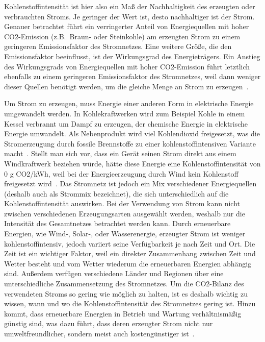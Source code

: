 Kohlenstoffintensität ist hier also ein Maß der Nachhaltigkeit des erzeugten oder verbrauchten Stroms.
Je geringer der Wert ist, desto nachhaltiger ist der Strom.
Genauer betrachtet führt ein verringerter Anteil von Energiequellen mit hoher \ac{CO2}-Emission (z.B.\ Braun- oder Steinkohle) am erzeugten Strom zu einem geringeren Emissionsfaktor des Stromnetzes.
Eine weitere Größe, die den Emissionsfaktor beeinflusst, ist der Wirkungsgrad des Energieträgers.
Ein Anstieg des Wirkungsgrads von Energiequellen mit hoher \ac{CO2}-Emission führt letztlich ebenfalls zu einem geringeren Emissionsfaktor des Stromnetzes, weil dann weniger dieser Quellen benötigt werden, um die gleiche Menge an Strom zu erzeugen~\cite{Icha.2020}.

Um Strom zu erzeugen, muss Energie einer anderen Form in elektrische Energie umgewandelt werden.
In Kohlekraftwerken wird zum Beispiel Kohle in einem Kessel verbrannt um Dampf zu erzeugen, der chemische Energie in elektrische Energie umwandelt.
Als Nebenprodukt wird viel Kohlendioxid freigesetzt, was die Stromerzeugung durch fossile Brennstoffe zu einer kohlenstoffintensiven Variante macht~\cite{Currie.2024}.
Stellt man sich vor, dass ein Gerät seinen Strom direkt aus einem Windkraftwerk beziehen würde, hätte diese Energie eine Kohlenstoffintensität von 0 g \ac{CO2}/\ac{kWh}, weil bei der Energieerzeugung durch Wind kein Kohlenstoff freigesetzt wird~\cite{GreenSoftwareFoundation.2022}.
Das Stromnetz ist jedoch ein Mix verschiedener Energiequellen (deshalb auch als Strommix bezeichnet), die sich unterschiedlich auf die Kohlenstoffintensität auswirken.
Bei der Verwendung von Strom kann nicht zwischen verschiedenen Erzeugungsarten ausgewählt werden, weshalb nur die Intensität des Gesamtnetzes betrachtet werden kann.
Durch erneuerbare Energien, wie Wind-, Solar-, oder Wasserenergie, erzeugter Strom ist weniger kohlenstoffintensiv, jedoch variiert seine Verfügbarkeit je nach Zeit und Ort.
Die Zeit ist ein wichtiger Faktor, weil ein direkter Zusammenhang zwischen Zeit und Wetter besteht und vom Wetter wiederum die erneuerbaren Energien abhängig sind.
Außerdem verfügen verschiedene Länder und Regionen über eine unterschiedliche Zusammensetzung des Stromnetzes.
Um die \ac{CO2}-Bilanz des verwendeten Stroms so gering wie möglich zu halten, ist es deshalb wichtig zu wissen, wann und wo die Kohlenstoffintensität des Stromnetzes gering ist.
Hinzu kommt, dass erneuerbare Energien in Betrieb und Wartung verhältnismäßig günstig sind, was dazu führt, dass deren erzeugter Strom nicht nur umweltfreundlicher, sondern meist auch kostengünstiger ist~\cite{NationalGrid.20231106T13:28:05.000Z}.

